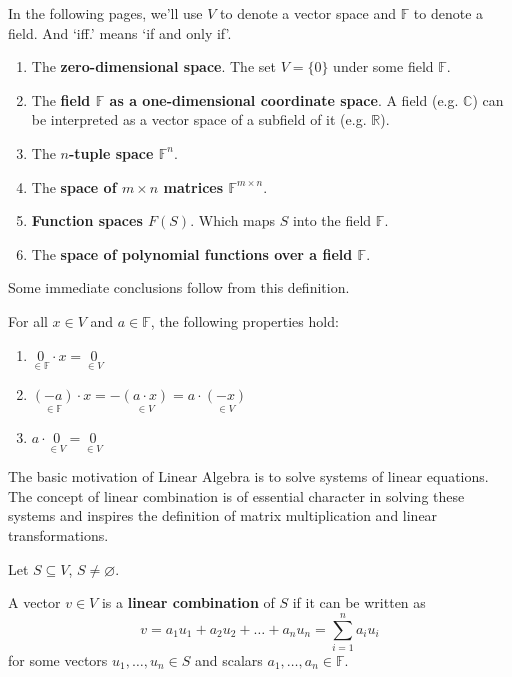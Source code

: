 In the following pages, we'll use $V$ to denote a vector space and $\mathbb{F}$ to denote a field. And `iff.' means `if and only if'.

\begin{example}\hfill
	\begin{enumerate}
		\item The \textbf{zero-dimensional space}. The set $V = \{ 0 \}$ under some field $\mathbb{F}$.
		\item The \textbf{field $\mathbb{F}$ as a one-dimensional coordinate space}. A field (e.g. $\mathbb{C}$) can be interpreted as a vector space of a subfield of it (e.g. $\mathbb{R}$).
		\item The \textbf{$n$-tuple space $\mathbb{F}^n$}.
		\item The \textbf{space of $m \times n$ matrices $\mathbb{F}^{m \times n}$}.
		\item \textbf{Function spaces $F(S)$}. Which maps $S$ into the field $\mathbb{F}$.
		\item The \textbf{space of polynomial functions over a field $\mathbb{F}$}.
	\end{enumerate}
\end{example}

Some immediate conclusions follow from this definition.

\begin{lemma}
	For all $x \in V$ and $a \in \mathbb{F}$, the following properties hold:
	\begin{enumerate}
		\item $\underset{\in \mathbb{F}}{0} \cdot x = \underset{\in V}{0}$
		\item $\underset{\in \mathbb{F}}{(-a)} \cdot x = - \underset{\in V}{(a \cdot x)} = a \cdot \underset{\in V}{(-x)}$
		\item $a \cdot \underset{\in V}{0} = \underset{\in V}{0}$
	\end{enumerate}
\end{lemma}

The basic motivation of Linear Algebra is to solve systems of linear equations. The concept of linear combination is of essential character in solving these systems and inspires the definition of matrix multiplication and linear transformations.

\begin{definition}
	Let $S \subseteq V$, $S \neq \varnothing$.
	
	A vector $v \in V$ is a \textbf{linear combination} of $S$ if it can be written as
	\[
		v = a_1 u_1 + a_2 u_2 + \ldots + a_n u_n = \sum_{i=1}^n a_i u_i
	\]
	for some vectors $u_1, \ldots, u_n \in S$ and scalars $a_1, \ldots, a_n \in \mathbb{F}$.
\end{definition}

